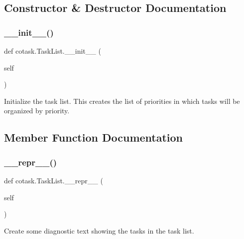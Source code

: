 \subsection{Constructor \& Destructor Documentation}
\mbox{\label{classcotask_1_1TaskList_a288413cdeddf60664542a92ce201200a}} 
\subsubsection{\texorpdfstring{\+\_\+\+\_\+init\+\_\+\+\_\+()}{\_\_init\_\_()}}
{\footnotesize\ttfamily def cotask.\+Task\+List.\+\_\+\+\_\+init\+\_\+\+\_\+ (\begin{DoxyParamCaption}\item[{}]{self }\end{DoxyParamCaption})}

\begin{DoxyVerb}Initialize the task list. This creates the list of priorities in
which tasks will be organized by priority. \end{DoxyVerb}
 

\subsection{Member Function Documentation}
\mbox{\label{classcotask_1_1TaskList_aa0632311ba902d3e5d75167dd4215dda}} 
\subsubsection{\texorpdfstring{\+\_\+\+\_\+repr\+\_\+\+\_\+()}{\_\_repr\_\_()}}
{\footnotesize\ttfamily def cotask.\+Task\+List.\+\_\+\+\_\+repr\+\_\+\+\_\+ (\begin{DoxyParamCaption}\item[{}]{self }\end{DoxyParamCaption})}

\begin{DoxyVerb}Create some diagnostic text showing the tasks in the task list.
\end{DoxyVerb}
 \mbox{\label{classcotask_1_1TaskList_aa690015d692390e17cb777ff367ae159}} 
